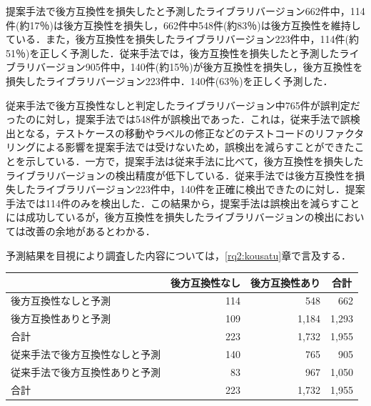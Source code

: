 \documentclass[11pt,dvipdfmx]{jreport}
\begin{document}
提案手法で後方互換性を損失したと予測したライブラリバージョン662件中，114件(約17％)は後方互換性を損失し，662件中548件(約83％)は後方互換性を維持している．また，後方互換性を損失したライブラリバージョン223件中，114件(約51％)を正しく予測した．従来手法では，後方互換性を損失したと予測したライブラリバージョン905件中，140件(約15％)が後方互換性を損失し，後方互換性を損失したライブラリバージョン223件中．140件(63％)を正しく予測した．

従来手法で後方互換性なしと判定したライブラリバージョン中765件が誤判定だったのに対し，提案手法では548件が誤検出であった．これは，従来手法で誤検出となる，テストケースの移動やラベルの修正などのテストコードのリファクタリングによる影響を提案手法では受けないため，誤検出を減らすことができたことを示している．一方で，提案手法は従来手法に比べて，後方互換性を損失したライブラリバージョンの検出精度が低下している．従来手法では後方互換性を損失したライブラリバージョン223件中，140件を正確に検出できたのに対し．提案手法では114件のみを検出した．この結果から，提案手法は誤検出を減らすことには成功しているが，後方互換性を損失したライブラリバージョンの検出においては改善の余地があるとわかる．

予測結果を目視により調査した内容については，\ref{rq2:kousatu}章で言及する．

\begin{table}[]
  \centering
  \label{fig:result}
  \begin{tabular}{l|r|r|r}
    \hline
                    & \multicolumn{1}{c|}{後方互換性なし} & \multicolumn{1}{c|}{後方互換性あり} & \multicolumn{1}{c}{合計} \\ \hline
    後方互換性なしと予測      & 114                          & 548                          & 662                    \\ \hline
    後方互換性ありと予測      & 109                          & 1,184                        & 1,293                  \\ \hline
    合計              & 223                          & 1,732                        & 1,955                  \\ \hline\hline
    従来手法で後方互換性なしと予測 & 140                          & 765                          & 905                    \\ \hline
    従来手法で後方互換性ありと予測 & 83                           & 967                          & 1,050                  \\ \hline
    合計              & 223                          & 1,732                        & 1,955                  \\ \hline
  \end{tabular}
\end{table}
\end{document}
